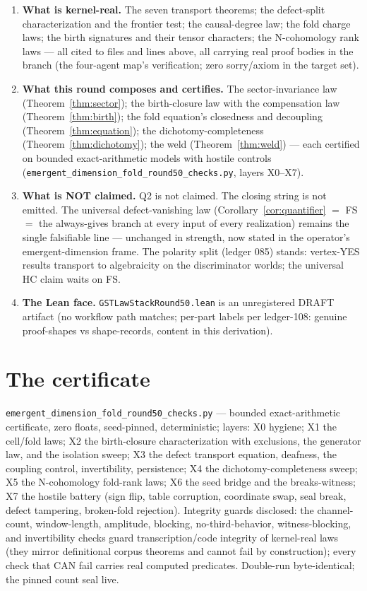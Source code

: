 \documentclass[11pt]{article}
\begin{document}
\begin{enumerate}
\item \textbf{What is kernel-real.} The seven transport theorems; the defect-split characterization and the frontier test; the causal-degree law; the fold charge laws; the birth signatures and their tensor characters; the N-cohomology rank laws — all cited to files and lines above, all carrying real proof bodies in the branch (the four-agent map's verification; zero sorry/axiom in the target set).
\item \textbf{What this round composes and certifies.} The sector-invariance law (Theorem~\ref{thm:sector}); the birth-closure law with the compensation law (Theorem~\ref{thm:birth}); the fold equation's closedness and decoupling (Theorem~\ref{thm:equation}); the dichotomy-completeness (Theorem~\ref{thm:dichotomy}); the weld (Theorem~\ref{thm:weld}) — each certified on bounded exact-arithmetic models with hostile controls (\texttt{emergent\_dimension\_fold\_round50\_checks.py}, layers X0--X7).
\item \textbf{What is NOT claimed.} Q2 is not claimed. The closing string is not emitted. The universal defect-vanishing law (Corollary~\ref{cor:quantifier} $=$ FS $=$ the always-gives branch at every input of every realization) remains the single falsifiable line — unchanged in strength, now stated in the operator's emergent-dimension frame. The polarity split (ledger 085) stands: vertex-YES results transport to algebraicity on the discriminator worlds; the universal HC claim waits on FS.
\item \textbf{The Lean face.} \texttt{GSTLawStackRound50.lean} is an unregistered DRAFT artifact (no workflow path matches; per-part labels per ledger-108: genuine proof-shapes vs shape-records, content in this derivation).
\end{enumerate}

\section*{The certificate}

\texttt{emergent\_dimension\_fold\_round50\_checks.py} — bounded exact-arithmetic certificate, zero floats, seed-pinned, deterministic; layers: X0 hygiene; X1 the cell/fold laws; X2 the birth-closure characterization with exclusions, the generator law, and the isolation sweep; X3 the defect transport equation, deafness, the coupling control, invertibility, persistence; X4 the dichotomy-completeness sweep; X5 the N-cohomology fold-rank laws; X6 the seed bridge and the breaks-witness; X7 the hostile battery (sign flip, table corruption, coordinate swap, seal break, defect tampering, broken-fold rejection). Integrity guards disclosed: the channel-count, window-length, amplitude, blocking, no-third-behavior, witness-blocking, and invertibility checks guard transcription/code integrity of kernel-real laws (they mirror definitional corpus theorems and cannot fail by construction); every check that CAN fail carries real computed predicates. Double-run byte-identical; the pinned count seal live.
\end{document}
